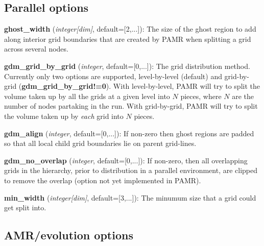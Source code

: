 \documentclass[aps,amssymb,unsortedaddress,nofootinbib]{revtex4}
\def\lsep{\itemsep 0.05in}
\begin{document}
\subsection{Parallel options}

\begin{list}{}{\lsep}
\item {\bf ghost\_width} ({\em integer[dim]}, default=[2,...]):
      The size of the ghost region to add along interior grid boundaries
      that are created by PAMR when splitting a grid across several nodes.
\item {\bf gdm\_grid\_by\_grid} ({\em integer}, default=[0,...]):
      The grid distribution method. Currently only two options are supported,
      level-by-level (default) and grid-by-grid ({\bf gdm\_grid\_by\_grid!=0}). 
      With level-by-level, PAMR will try to split the volume taken up by all 
      the grids at a given level into $N$ pieces, where $N$ are the number of 
      nodes partaking in the run. With grid-by-grid, PAMR will try to split 
      the volume taken up by {\em each} grid into $N$ pieces.
\item {\bf gdm\_align} ({\em integer}, default=[0,...]):
      If non-zero then ghost regions are padded so that all local child grid
      boundaries lie on parent grid-lines.
\item {\bf gdm\_no\_overlap} ({\em integer}, default=[0,...]):
      If non-zero, then all overlapping grids in the hierarchy, prior to distribution
      in a parallel environment, are clipped to remove the overlap (option 
      not yet implemented in PAMR).
\item {\bf min\_width} ({\em integer[dim]}, default=[3,...]):
      The minumum size that a grid could get split into.
\end{list}

\subsection{AMR/evolution options}\label{sec_amr_ops}
\end{document}
